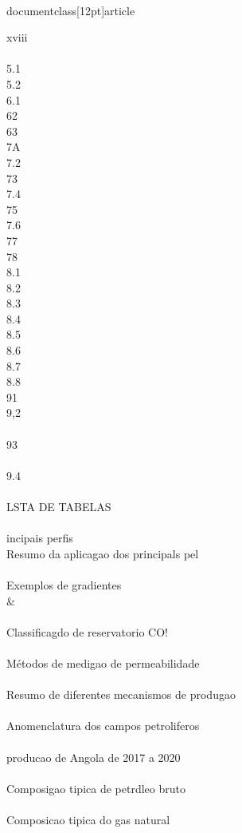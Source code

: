 \\documentclass[12pt]{article}
\begin{document}
xviii\\
\\
5.1\\
5.2\\
6.1\\
62\\
63\\
7A\\
7.2\\
73\\
7.4\\
75\\
7.6\\
77\\
78\\
8.1\\
8.2\\
8.3\\
8.4\\
8.5\\
8.6\\
8.7\\
8.8\\
91\\
9,2\\
\\
93\\
\\
9.4\\
\\
LSTA DE TABELAS\\
\\
incipais perfis\\
Resumo da aplicagao dos principals pel\\
\\
Exemplos de gradientes \\&\\
\\
Classificagdo de reservatorio CO!\\
\\
Métodos de medigao de permeabilidade\\
\\
Resumo de diferentes mecanismos de produgao\\
\\
Anomenclatura dos campos petroliferos\\
\\
producao de Angola de 2017 a 2020\\
\\
Composigao tipica de petrdleo bruto\\
\\
Composicao tipica do gas natural\\
\end{document}
